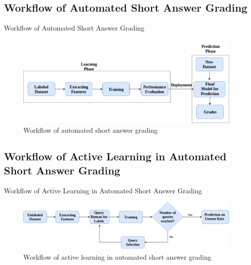 \documentclass{beamer}
\begin{document}
\subsection{Workflow of Automated Short Answer Grading}
\begin{frame}{Workflow of Automated Short Answer Grading}
	
	\begin{figure}[!htb]
		\centering
		\includegraphics[scale=0.36]{images/auto_workflow}
		\caption{Workflow of automated short answer grading \cite{Burrows2015}}
		\label{auto_workflow}
	\end{figure}
\end{frame}


\subsection{Workflow of Active Learning in Automated Short Answer Grading}
\begin{frame}{Workflow of Active Learning in Automated Short Answer Grading}
	\begin{figure}[!htb]
		\centering
		\includegraphics[scale=0.30]{images/AL_workflow}
		\caption{Workflow of active learning in automated short answer grading}
		\label{auto_workflow}
	\end{figure}
\end{frame}
\end{document}
